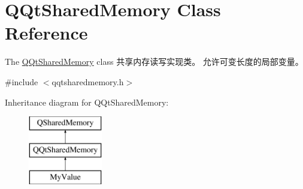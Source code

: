 \hypertarget{class_q_qt_shared_memory}{}\section{Q\+Qt\+Shared\+Memory Class Reference}
\label{class_q_qt_shared_memory}


The \mbox{\hyperlink{class_q_qt_shared_memory}{Q\+Qt\+Shared\+Memory}} class 共享内存读写实现类。 允许可变长度的局部变量。  




{\ttfamily \#include $<$qqtsharedmemory.\+h$>$}

Inheritance diagram for Q\+Qt\+Shared\+Memory\+:\begin{figure}[H]
\begin{center}
\leavevmode
\includegraphics[height=3.000000cm]{class_q_qt_shared_memory}
\end{center}
\end{figure}
